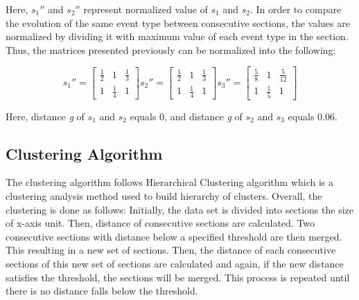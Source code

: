 Here, $s_1''$ and $s_2''$ represent normalized value of $s_1$ and $s_2$. In order to compare the evolution of the same event type between consecutive sections, the values are normalized by dividing it with maximum value of each event type in the section. Thus, the matrices presented previously can be normalized into the following:

\[
s_1'' = \begin{bmatrix}
  \frac{1}{2} & 1 & \frac{1}{3}\\ 
  1 & \frac{1}{4} & 1
\end{bmatrix}
s_2'' = \begin{bmatrix}
  \frac{1}{2} & 1 & \frac{1}{3}\\ 
  1 & \frac{1}{4} & 1
\end{bmatrix}
s_3'' = \begin{bmatrix}
  \frac{5}{8} & 1 & \frac{5}{12}\\
  1 & \frac{1}{5} & 1 
\end{bmatrix}
\]

Here, distance \textit{g} of $s_1$ and $s_2$ equals 0, and distance \textit{g} of $s_2$ and $s_3$ equals 0.06. 

\subsection{Clustering Algorithm}
The clustering algorithm follows Hierarchical Clustering algorithm \cite{maimon} which is a clustering analysis method used to build hierarchy of clusters. Overall, the clustering is done as follows: Initially, the data set is divided into sections the size of x-axis unit. Then, distance of consecutive sections are calculated. Two consecutive sections with distance below a specified threshold are then merged. This resulting in a new set of sections. Then, the distance of each consecutive sections of this new set of sections are calculated and again, if the new distance satisfies the threshold, the sections will be merged. This process is repeated until there is no distance falls below the threshold.








